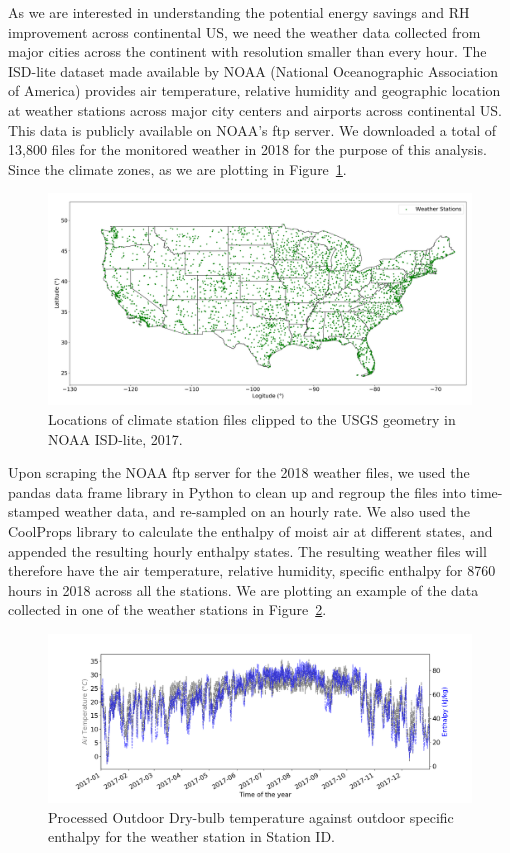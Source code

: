 As we are interested in understanding the potential energy savings and RH improvement across continental US, we need the weather data collected from major cities across the continent with resolution smaller than every hour. The ISD-lite dataset made available by NOAA (National Oceanographic Association of America) provides air temperature, relative humidity and geographic location at weather stations across major city centers and airports across continental US. This data is publicly available on NOAA’s ftp server. We downloaded a total of 13,800 files for the monitored weather in 2018 for the purpose of this analysis. Since the climate zones, as we are plotting in Figure~\ref{fg:stations}. 

\begin{figure}[h!]
\centering
\includegraphics[width=\textwidth]{stations.png}
\caption{Locations of climate station files clipped to the USGS geometry in NOAA ISD-lite, 2017.}\label{fg:stations}
\end{figure}

Upon scraping the NOAA ftp server for the 2018 weather files, we used the pandas data frame library in Python to clean up and regroup the files into time-stamped weather data, and re-sampled on an hourly rate. We also used the CoolProps library to calculate the enthalpy of moist air at different states, and appended the resulting hourly enthalpy states. The resulting weather files will therefore have the air temperature, relative humidity, specific enthalpy for 8760 hours in 2018 across all the stations. We are plotting an example of the data collected in one of the weather stations in Figure~\ref{fg:sampleh}.


\begin{figure}
\centering
\includegraphics[width=\textwidth]{tbd_h.png}
\caption{ Processed Outdoor Dry-bulb temperature against outdoor specific enthalpy for the weather station in Station ID.}\label{fg:sampleh}
\end{figure}


